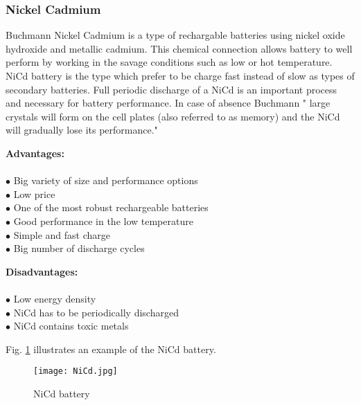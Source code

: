 \subsubsection{Nickel Cadmium \label{sec:tech}}
 Buchmann\cite{7} Nickel Cadmium is a type of rechargable batteries using nickel oxide hydroxide and metallic cadmium. This chemical connection allows battery to well perform by working in the savage conditions such as low or hot temperature. NiCd battery is the type which prefer to be charge fast instead of slow as types of secondary batteries. Full periodic discharge of a NiCd is an important process and necessary for battery performance. In case of absence  Buchmann\cite{7} " large crystals will form on the cell plates (also referred to as memory) and the NiCd will gradually lose its performance."
 
 \newpage

\begin{multicols}{2}

	\textbf{Advantages:} \\ \\
	$\bullet$ Big variety of size and performance options\\
	$\bullet$ Low price\\
	$\bullet$ One of the most robust rechargeable batteries\\
	$\bullet$ Good performance in the low temperature\\
	$\bullet$ Simple and fast charge\\
	$\bullet$ Big number of discharge cycles\\
	
	
	\columnbreak
	
	\textbf{Disadvantages:} \\ \\
	$\bullet$ Low energy density\\
	$\bullet$ NiCd has to be periodically discharged\\
	$\bullet$ NiCd contains toxic metals\\ 


\end{multicols}

Fig. \ref{fig: nicd} illustrates an example of the NiCd battery. 



\begin{figure}[h]
	\centering
	\texttt{[image: NiCd.jpg]}
	\caption{NiCd battery\cite{9}}
	\label{fig: nicd}
\end{figure} 



